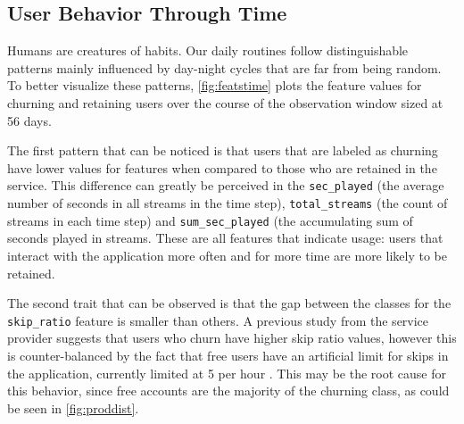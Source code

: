 \documentclass{kththesis}
\begin{document}
\subsection{User Behavior Through Time}

Humans are creatures of habits. Our daily routines follow distinguishable patterns mainly influenced by day-night cycles that are far from being random. To better visualize these patterns, \autoref{fig:featstime} plots the feature values for churning and retaining users over the course of the observation window sized at 56 days. 

The first pattern that can be noticed is that users that are labeled as churning have lower values for features when compared to those who are retained in the service. This difference can greatly be perceived in the \verb|sec_played| (the average number of seconds in all streams in the time step), \verb|total_streams| (the count of streams in each time step) and \verb|sum_sec_played| (the accumulating sum of seconds played in streams. These are all features that indicate usage: users that interact with the application more often and for more time are more likely to be retained.

The second trait that can be observed is that the gap between the classes for the \verb|skip_ratio| feature is smaller than others. A previous study from the service provider suggests that users who churn have higher skip ratio values, however this is counter-balanced by the fact that free users have an artificial limit for skips in the application, currently limited at 5 per hour . This may be the root cause for this behavior, since free accounts are the majority of the churning class, as could be seen in \autoref{fig:proddist}.
	
\end{document}
